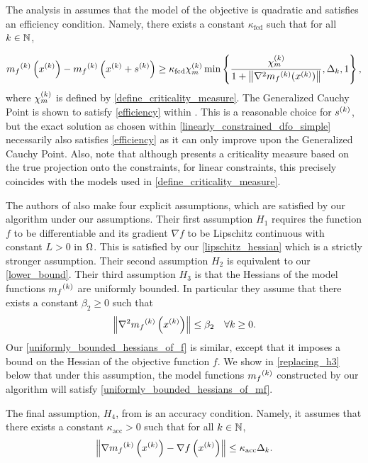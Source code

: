 \documentclass{article}
\begin{document}
The analysis in \cite{Conejo:2013:GCT:2620806.2621814}  assumes that the model of the objective is quadratic and satisfies an efficiency condition.
Namely, there exists a constant $\kappa_{\textrm{fcd}}$ such that for all $k \in \mathbb N$,

\begin{align}
\label{efficiency}
{{m}_f}^{(k)}\left(x^{(k)}\right) - {{m}_f}^{(k)}\left(x^{(k)} + {{s}^{(k)}}\right) \ge \kappa_{\textrm{fcd}} {\chi_m^{(k)}} \min\left\{ \frac{{\chi_m^{(k)}}}{1+\left\|\nabla^2 {{m}_f}^{(k)}(x^{(k)})\right\|}, \Delta_k, 1 \right\},
\end{align}
where ${\chi_m^{(k)}}$ is defined by \cref{define_criticality_measure}.
The Generalized Cauchy Point is shown to satisfy \cref{efficiency} within \cite{Conn:2000:TM:357813}.
This is a reasonable choice for ${{s}^{(k)}}$, but the exact solution as chosen within \cref{linearly_constrained_dfo_simple} 
necessarily also satisfies \cref{efficiency} as it can only improve upon the Generalized Cauchy Point.
Also, note that although \cite{Conejo:2013:GCT:2620806.2621814} presents a criticality measure based on the true projection onto the constraints,
for linear constraints, this precisely coincides with the models used in \cref{define_criticality_measure}.

The authors of \cite{Conejo:2013:GCT:2620806.2621814} also make four explicit assumptions, which are satisfied by our algorithm under our assumptions.     
Their first assumption $H_1$ requires the function $f$ to be differentiable and its gradient $\nabla f$ to be Lipschitz continuous with constant $L > 0$ in $\Omega$.  This is satisfied by our 
\cref{lipschitz_hessian} which is a strictly stronger assumption.
Their second assumption $H_2$ is equivalent to our \cref{lower_bound}.    Their third assumption $H_3$ is that
the Hessians of the model functions ${{m}_f}^{(k)}$ are uniformly bounded.    In particular they assume that there exists a constant $\beta_2 \ge 0$ such that
\begin{equation}\label{uniformly_bounded_hessians_of_mf}
 \left\|\nabla^2 {{m}_f}^{(k)}\left(x^{(k)}\right)\right\| \le \beta_2 \quad \forall k \ge 0.
 \end{equation}
Our  \cref{uniformly_bounded_hessians_of_f}
 is similar, except that it imposes a bound on the Hessian of the objective function $f$.    We show in \cref{replacing_h3} below that under this assumption,  the model functions ${{m}_f}^{(k)}$ constructed by our algorithm will satisfy \cref{uniformly_bounded_hessians_of_mf}.


The final assumption, $H_4$,  from \cite{Conejo:2013:GCT:2620806.2621814} is an accuracy condition.
Namely, it assumes that there exists a constant $\kappa_{\textrm{acc}} > 0$ such that for all $k \in \mathbb N$,
\begin{equation}
\label{accuracy}
\left\| \nabla {{m}_f}^{(k)}\left(x^{(k)}\right) - \nabla f\left(x^{(k)}\right) \right\| \le \kappa_{\textrm{acc}} \Delta_k.
\end{equation}
\end{document}
